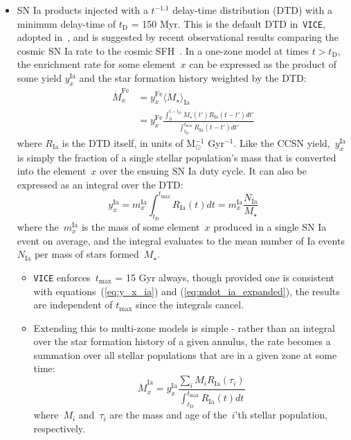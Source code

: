 \documentclass[fleqn, usenatbib]{mnras}
\newcommand{\ddfrac}[2]{\frac{\displaystyle #1}{\displaystyle #2}}
\newcommand{\refp}[1]{(\ref{#1})}
\begin{document}
\begin{itemize}
	\item SN Ia products injected with a $t^{-1.1}$ delay-time distribution 
	(DTD) with a minimum delay-time of $t_\text{D}$ = 150 Myr. This is the 
	default DTD in~\texttt{VICE}, adopted in~\citet{Johnson2020}, and is 
	suggested by recent observational results comparing the cosmic SN Ia rate 
	to the cosmic SFH~\citep{Maoz2012, Maoz2017}. In a 
	one-zone model at times $t > t_\text{D}$, the enrichment rate for some 
	element~$x$ can be expressed as the product of some yield $y_x^\text{Ia}$ 
	and the star formation history weighted by the DTD: 
	\begin{subequations}\begin{align} 
	\dot{M}_x^\text{Fe} &= y_x^\text{Fe}\langle\dot{M}_\star\rangle_\text{Ia} 
	\label{eq:mdot_ia} 
	\\ 
	&= y_x^\text{Fe} \ddfrac{
		\int_0^{t - t_\text{D}} \dot{M}_\star(t') R_\text{Ia}(t - t') dt' 
	}{
		\int_{t_\text{D}}^{t_\text{max}} R_\text{Ia}(t - t') dt' 
	} 
	\label{eq:mdot_ia_expanded} 
	\end{align}\end{subequations} 
	where $R_\text{Ia}$ is the DTD itself, in units of M$_\odot^{-1}$ 
	Gyr$^{-1}$. Like the CCSN yield,~$y_x^\text{Ia}$ is simply the fraction of 
	a single stellar population's mass that is converted into the element~$x$ 
	over the ensuing SN Ia duty cycle. It can also be expressed as an integral 
	over the DTD: 
	\begin{equation} 
	y_x^\text{Ia} = m_x^\text{Ia} \int_{t_\text{D}}^{t_\text{max}} 
		R_\text{Ia}(t) dt = m_x^\text{Ia} \frac{N_\text{Ia}}{M_\star} 
	\label{eq:y_x_ia} 
	\end{equation} 
	where the~$m_x^\text{Ia}$ is the mass of some element~$x$ produced in a 
	single SN Ia event on average, and the integral evaluates to the mean 
	number of Ia events~$N_\text{Ia}$ per mass of stars formed~$M_\star$. 
	\begin{itemize} 
		\item \texttt{VICE} enforces~$t_\text{max}$ = 15 Gyr always, though 
		provided one is consistent with equations~\refp{eq:y_x_ia} and 
		\refp{eq:mdot_ia_expanded}, the results are independent of 
		$t_\text{max}$ since the integrals cancel. 

		\item Extending this to multi-zone models is simple - rather than an 
		integral over the star formation history of a given annulus, the rate 
		becomes a summation over all stellar populations that are in a given 
		zone at some time: 
		\begin{equation} 
			\dot{M}_x^\text{Ia} = y_x^\text{Ia} \ddfrac{
				\sum_i M_i R_\text{Ia}(\tau_i) 
			}{
				\int_{t_\text{D}}^{t_\text{max}} R_\text{Ia}(t) dt 
			} 
		\end{equation} 
		where~$M_i$ and~$\tau_i$ are the mass and age of the~$i$'th stellar 
		population, respectively. 


\end{itemize}
\end{itemize}
\end{document}
